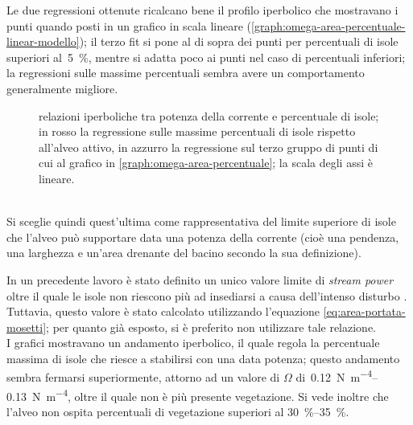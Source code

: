 Le due regressioni ottenute ricalcano bene il profilo iperbolico che mostravano i punti quando posti in un grafico in scala lineare (\cref{graph:omega-area-percentuale-linear-modello}); il terzo fit si pone al di sopra dei punti per percentuali di isole superiori al~\SI{5}{\percent}, mentre si adatta poco ai punti nel caso di percentuali inferiori; la regressioni sulle massime percentuali sembra avere un comportamento generalmente migliore.
%
\begin{figure}
	\centering
	
	\caption[relazioni iperboliche tra potenza della corrente e percentuale di isole]{relazioni iperboliche tra potenza della corrente e percentuale di isole; in rosso la regressione sulle massime percentuali di isole rispetto all'alveo attivo, in azzurro la regressione sul terzo gruppo di punti di cui al grafico in \cref{graph:omega-area-percentuale}; la scala degli assi è lineare.}
	\label{graph:omega-area-percentuale-linear-regressioni}
\end{figure}
%
\\
Si sceglie quindi quest'ultima come rappresentativa del limite superiore di isole che l'alveo può supportare data una potenza della corrente (cioè una pendenza, una larghezza e un'area drenante del bacino secondo la sua definizione).

In un precedente lavoro è stato definito un unico valore limite di \emph{stream power} oltre il quale le isole non riescono più ad insediarsi a causa dell'intenso disturbo .
Tuttavia, questo valore è stato calcolato utilizzando l'equazione \eqref{eq:area-portata-mosetti}; per quanto già esposto, si è preferito non utilizzare tale relazione.
\\
I grafici mostravano un andamento iperbolico, il quale regola la percentuale massima di isole che riesce a stabilirsi con una data potenza;
questo andamento sembra fermarsi superiormente, attorno ad un valore di $\Omega$ di~\SIrange[range-phrase={-}, range-units = single]{0.12}{0.13}{\newton\per\metre\tothe{4}}, oltre il quale non è più presente vegetazione.
Si vede inoltre che l'alveo non ospita percentuali di vegetazione superiori al \SIrange[range-phrase={-}, range-units = single]{30}{35}{\percent}.

